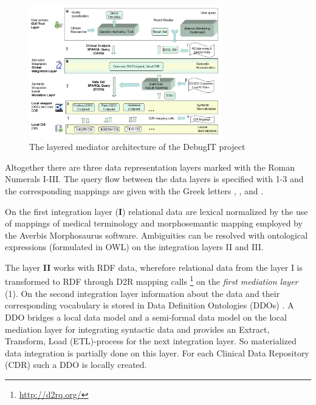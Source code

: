 \begin{figure}[]
	\begin{center}
		\includegraphics[width=0.75\textwidth]{figures/DebugIT-Ontology-mediated-layered-Data-Integration-architecture.png}
	\end{center}
	\caption{The layered mediator architecture of the DebugIT project}
	\label{DebugITArchitectureFigure}
\end{figure}

Altogether there are three data representation layers marked with the Roman Numerals I-III. The query flow between the data layers is specified with 1-3 and the corresponding mappings are given with the Greek letters \textalpha , \textbeta,  and \textgamma .

On the first integration layer (\textbf{I}) relational data are lexical normalized by the use of mappings of medical terminology and morphosemantic mapping employed by the Averbis Morphosaurus software\cite{DaumkeDiss}. Ambiguities can be resolved with ontological expressions (formulated in OWL) on the integration layers II and III. 

The layer \textbf{II} works with RDF data, wherefore relational data from the layer I is transformed to RDF through D2R mapping calls \footnote{\url{http://d2rq.org/}} on the\emph{ first mediation layer} (1). On the second integration layer information about the data and their corresponding vocabulary is stored in Data Definition Ontologies (DDOs) \cite{DebugITDDO}. A DDO bridges a local data model and a semi-formal data model on the local mediation layer for integrating syntactic data and provides an Extract, Transform, Load (ETL)-process \cite[p. 382]{DBLP:books/dp/LeserN2006} for the next integration layer. So materialized data integration is partially done on this layer.
For each Clinical Data Repository (CDR) such a DDO is locally created. 

